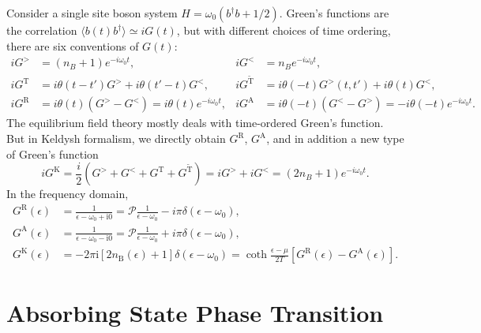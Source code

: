 \documentclass{SciPost}
\begin{document}
Consider a single site boson system $H = \omega_0 (b^\dagger b + 1/2)$. Green's functions are the correlation $\langle b(t) b^\dagger\rangle \simeq iG(t)$, but with different choices of time ordering, there are six conventions of $G(t)$:
\begin{equation}
\begin{aligned}
	iG^> &= (n_B+1)e^{-i\omega_0 t}, &
	iG^< &= n_B e^{-i\omega_0 t}, \\
	iG^{\mathrm{T}} &= i\theta(t-t')G^> + i\theta(t'-t)G^<, &
	iG^{\tilde{\mathrm{T}}} &= i\theta(-t)G^>(t,t') + i\theta(t)G^<, \\
	iG^{\mathrm{R}} &= i\theta(t) (G^>-G^<) = i\theta(t)e^{-i\omega_0 t}, &
	iG^{\mathrm{A}} &= i\theta(-t) (G^<-G^>) = -i\theta(-t)e^{-i\omega_0 t}.
\end{aligned}
\end{equation}
The equilibrium field theory mostly deals with time-ordered Green's function. But in Keldysh formalism, we directly obtain $G^{\mathrm{R}}$, $G^{\mathrm{A}}$, and in addition a new type of Green's function
\begin{equation}
	iG^{\mathrm{K}} = \frac{i}{2}\left(G^>+G^<+G^{\mathrm{T}}+G^{\tilde{\mathrm{T}}}\right)=iG^> + iG^< = (2n_B+1)e^{-i\omega_0 t}.
\end{equation}
In the frequency domain, 
\begin{equation}
\begin{aligned}
	G^{\mathrm{R}}(\epsilon) &= \frac{1}{\epsilon-\omega_0+\mathrm{i} 0} = \mathcal{P}\frac{1}{\epsilon-\omega_0} - i\pi \delta(\epsilon-\omega_0), \\
	G^{\mathrm{A}}(\epsilon) &= \frac{1}{\epsilon-\omega_0-\mathrm{i} 0} = \mathcal{P}\frac{1}{\epsilon-\omega_0} + i\pi \delta(\epsilon-\omega_0), \\
	G^{\mathrm{K}}(\epsilon) &= -2 \pi \mathrm{i}\left[2 n_{\mathrm{B}}(\epsilon)+1\right] \delta\left(\epsilon-\omega_0\right)= \coth \frac{\epsilon-\mu}{2 T}\left[G^{\mathrm{R}}(\epsilon)-G^{\mathrm{A}}(\epsilon)\right].
\end{aligned}
\end{equation}



\section{Absorbing State Phase Transition}
\end{document}
